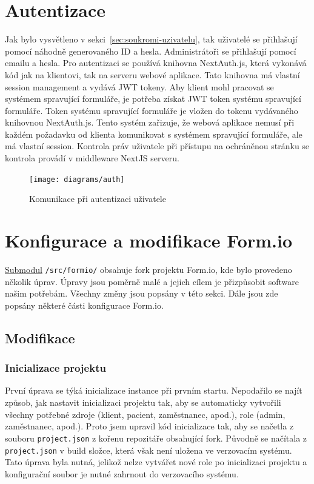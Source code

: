 \section{Autentizace}\label{sec:auth}

Jak bylo vysvětleno v sekci~\ref{sec:soukromi-uzivatelu}, tak uživatelé se přihlašují pomocí náhodně generovaného ID a hesla.
Administrátoři se přihlašují pomocí emailu a hesla.
Pro autentizaci se používá knihovna NextAuth.js, která vykonává kód jak na klientovi, tak na serveru webové aplikace.
Tato knihovna má vlastní session management a vydává JWT tokeny.
Aby klient mohl pracovat se systémem spravující formuláře, je potřeba získat JWT token systému spravující formuláře.
Token systému spravující formuláře je vložen do tokenu vydávaného knihovnou NextAuth.js.
Tento systém zařizuje, že webová aplikace nemusí při každém požadavku od klienta komunikovat s systémem spravující formuláře, ale má vlastní session.
Kontrola práv uživatele při přístupu na ochráněnou stránku se kontrola provádí v middleware NextJS serveru.

\begin{figure}[H]
    \centering
    \texttt{[image: diagrams/auth]}
    \caption{Komunikace při autentizaci uživatele}\label{fig:auth}
\end{figure}


\section{Konfigurace a modifikace Form.io}\label{sec:konfigurace-a-modifikace-form.io}

\href{https://git-scm.com/book/en/v2/Git-Tools-Submodules}{Submodul} \lstinline{/src/formio/} obsahuje fork projektu Form.io, kde bylo provedeno několik úprav.
Úpravy jsou poměrně malé a jejich cílem je přizpůsobit software našim potřebám.
Všechny změny jsou popsány v této sekci.
Dále jsou zde popsány některé části konfigurace Form.io.

\subsection{Modifikace}\label{subsec:modifikace}

\subsubsection{Inicializace projektu}\label{subsubsec:inicializace-projektu}

První úprava se týká inicializace instance při prvním startu.
Nepodařilo se najít způsob, jak nastavit inicializaci projektu tak, aby se automaticky vytvořili všechny potřebné zdroje (klient, pacient, zaměstnanec, apod.), role (admin, zaměstnanec, apod.).
Proto jsem upravil kód inicializace tak, aby se načetla z souboru \lstinline{project.json} z kořenu repozitáře obsahující fork.
Původně se načítala z \lstinline{project.json} v build složce, která však není uložena ve verzovacím systému.
Tato úprava byla nutná, jelikož nelze vytvářet nové role po inicializaci projektu a konfigurační soubor je nutné zahrnout do verzovacího systému.

